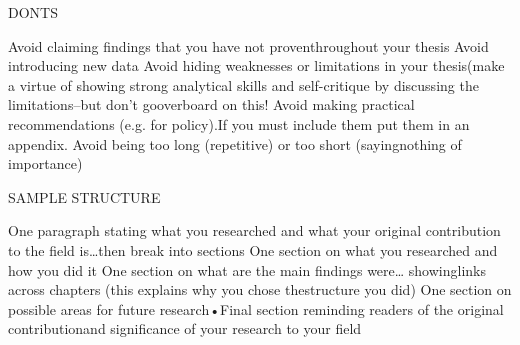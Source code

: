 DONTS

Avoid claiming findings that you have not proventhroughout your thesis
Avoid introducing new data
Avoid hiding weaknesses or limitations in your thesis(make a virtue of showing strong analytical skills and self-critique by discussing the limitations--but don’t gooverboard on this!
Avoid making practical recommendations (e.g. for policy).If you must include them put them in an appendix.
Avoid being too long (repetitive) or too short (sayingnothing of importance)


SAMPLE STRUCTURE

One paragraph stating what you researched and what your original contribution to the field is…then break into sections
One section on what you researched and how you did it
One section on what are the main findings were… showinglinks across chapters (this explains why you chose thestructure you did)
One section on possible areas for future research•Final section reminding readers of the original contributionand significance of your research to your field